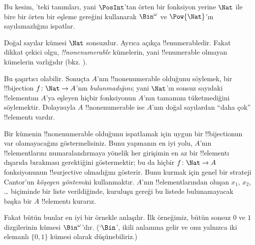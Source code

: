 \documentclass[../../../include/open-logic-section]{subfiles}
\begin{document}


\begin{editorial}
  Bu kesim, 'teki tanımları, yani $\PosInt$'tan örten bir
  fonksiyon yerine $\Nat$ ile bire bir örten bir eşleme gereğini kullanarak
  $\Bin^\omega$ ve $\Pow{\Nat}$'ın sayılamazlığını ispatlar.
\end{editorial}

\begin{explain}
Doğal sayılar kümesi $\Nat$ sonsuzdur. Ayrıca açıkça !!{enumerable}dir.
Fakat dikkat çekici olgu, \emph{!!{nonenumerable}} kümelerin, yani
!!{enumerable} olmayan kümelerin varlığıdır
(bkz. ).

Bu şaşırtıcı olabilir. Sonuçta $A$'nın !!{nonenumerable} olduğunu söylemek,
bir !!{bijection} $f\colon\Nat\to A$'nın \emph{bulunmadığını}; yani
$\Nat$'ın sonsuz sayıdaki !!{element}ını $A$'ya eşleyen hiçbir fonksiyonun
$A$'nın tamamını tüketmediğini söylemektir. Dolayısıyla $A$
!!{nonenumerable} ise $A$'nın doğal sayılardan ``daha çok'' !!{element}ı
vardır.

Bir kümenin !!{nonenumerable} olduğunu ispatlamak için uygun bir
!!{bijection}un var olamayacağını göstermelisiniz. Bunu yapmanın en iyi yolu,
$A$'nın !!{element}larını numaralandırmaya yönelik her girişimin en az bir
!!{element}ı dışarıda bırakması gerektiğini göstermektir; bu da hiçbir
$f\colon\Nat\to A$ fonksiyonunun !!{surjective} olmadığını gösterir. Bunu
kurmak için genel bir strateji Cantor'un \emph{köşegen yöntemi}ni
kullanmaktır. $A$'nın !!{element}larından oluşan $x_1$, $x_2$, \dots{}
biçiminde bir liste verildiğinde, kuruluşu gereği bu listede bulunamayacak başka bir $A$
!!{element}ı kurarız.

Fakat bütün bunlar en iyi bir örnekle anlaşılır. İlk örneğimiz, bütün sonsuz
$0$ ve $1$ dizgilerinin kümesi $\Bin^\omega$'dır. (`$\Bin$', ikili anlamına
gelir ve onu yalnızca iki elemanlı $\{0,1\}$ kümesi olarak düşünebiliriz.)
\end{explain}
\end{document}
